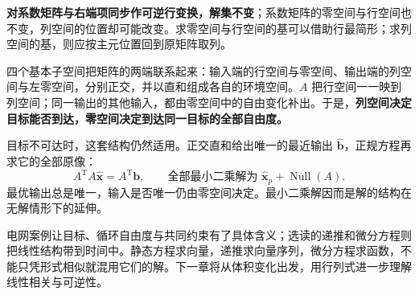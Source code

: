 \documentclass[a4paper,12pt,twoside,openany,fontset=none]{ctexbook}
\numberwithin{equation}{chapter}
\begin{document}
\textbf{对系数矩阵与右端项同步作可逆行变换，解集不变}；系数矩阵的零空间与行空间也不变，列空间的位置却可能改变。求零空间与行空间的基可以借助行最简形；求列空间的基，则应按主元位置回到原矩阵取列。

四个基本子空间把矩阵的两端联系起来：输入端的行空间与零空间、输出端的列空间与左零空间，分别正交，并以直和组成各自的环境空间。$A$ 把行空间一一映到列空间；同一输出的其他输入，都由零空间中的自由变化补出。于是，\textbf{列空间决定目标能否到达，零空间决定到达同一目标的全部自由度。}

目标不可达时，这套结构仍然适用。正交直和给出唯一的最近输出 $\widehat{\boldsymbol b}$，正规方程再求它的全部原像：
\begin{equation*}
 A^{\mathrm T}A\widehat{\boldsymbol x}=A^{\mathrm T}\boldsymbol b,
 \qquad\text{全部最小二乘解为 }\widehat{\boldsymbol x}_p+\operatorname{Null}(A).
\end{equation*}
最优输出总是唯一，输入是否唯一仍由零空间决定。最小二乘解因而是解的结构在无解情形下的延伸。

电网案例让目标、循环自由度与共同约束有了具体含义；选读的递推和微分方程则把线性结构带到时间中。静态方程求向量，递推求向量序列，微分方程求函数，不能只凭形式相似就混用它们的解。下一章将从体积变化出发，用行列式进一步理解线性相关与可逆性。

\par\clearpage
\endgroup

\end{document}
